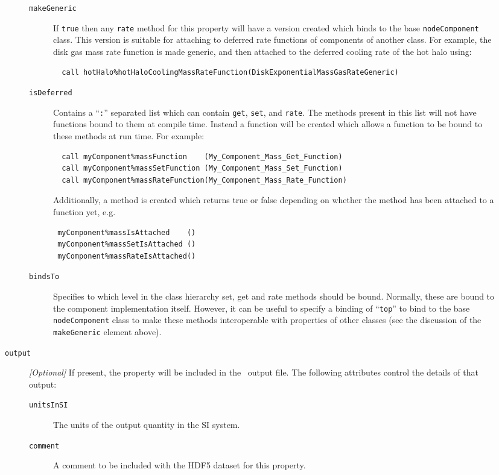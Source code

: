 \begin{description}
\begin{description}
\begin{description}
\item [{\tt makeGeneric}] If {\tt true} then any {\tt rate} method for this property will have a version created which binds to the base {\tt nodeComponent} class. This version is suitable for attaching to deferred rate functions of components of another class. For example, the disk gas mass rate function is made generic, and then attached to the deferred cooling rate of the hot halo using:
\begin{verbatim}
  call hotHalo%hotHaloCoolingMassRateFunction(DiskExponentialMassGasRateGeneric)
\end{verbatim}
\item [{\tt isDeferred}] Contains a ``{\tt :}'' separated list which can contain {\tt get}, {\tt set}, and {\tt rate}. The methods present in this list will not have functions bound to them at compile time. Instead a function will be created which allows a function to be bound to these methods at run time. For example:
\begin{verbatim}
  call myComponent%massFunction    (My_Component_Mass_Get_Function)
  call myComponent%massSetFunction (My_Component_Mass_Set_Function)
  call myComponent%massRateFunction(My_Component_Mass_Rate_Function)
\end{verbatim}
Additionally, a method is created which returns true or false depending on whether the method has been attached to a function yet, e.g.
\begin{verbatim}
 myComponent%massIsAttached    ()
 myComponent%massSetIsAttached ()
 myComponent%massRateIsAttached()
\end{verbatim}
\item [{\tt bindsTo}] Specifies to which level in the class hierarchy set, get and rate methods should be bound. Normally, these are bound to the component implementation itself. However, it can be useful to specify a binding of ``{\tt top}'' to bind to the base {\tt nodeComponent} class to make these methods interoperable with properties of other classes (see the discussion of the {\tt makeGeneric} element above).
\end{description}
\item [{\tt output}] \emph{[Optional]} If present, the property will be included in the \glc\ output file. The following attributes control the details of that output:
\begin{description}
\item [{\tt unitsInSI}] The units of the output quantity in the SI system.
\item [{\tt comment}] A comment to be included with the HDF5 dataset for this property.

\end{description}
\end{description}
\end{description}
